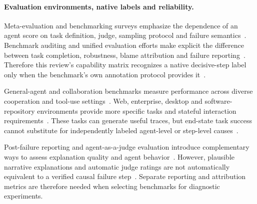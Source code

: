 \paragraph{Evaluation environments, native labels and reliability.}
Meta-evaluation and benchmarking surveys emphasize the dependence of an agent score on task definition, judge, sampling protocol and failure semantics~\cite{ext003,ext006,ext029}.
Benchmark auditing and unified evaluation efforts make explicit the difference between task completion, robustness, blame attribution and failure reporting~\cite{ext030,ext031,ext036}.
Therefore this review's capability matrix recognizes a native decisive-step label only when the benchmark's own annotation protocol provides it~\cite{ext038,ext039,ext139}.

General-agent and collaboration benchmarks measure performance across diverse cooperation and tool-use settings~\cite{ext072,ext073,ext133}.
Web, enterprise, desktop and software-repository environments provide more specific tasks and stateful interaction requirements~\cite{ext134,ext135,ext136}.
These tasks can generate useful traces, but end-state task success cannot substitute for independently labeled agent-level or step-level causes~\cite{ext137,ext138}.

Post-failure reporting and agent-as-a-judge evaluation introduce complementary ways to assess explanation quality and agent behavior~\cite{ext063}.
However, plausible narrative explanations and automatic judge ratings are not automatically equivalent to a verified causal failure step~\cite{ext101}.
Separate reporting and attribution metrics are therefore needed when selecting benchmarks for diagnostic experiments.

